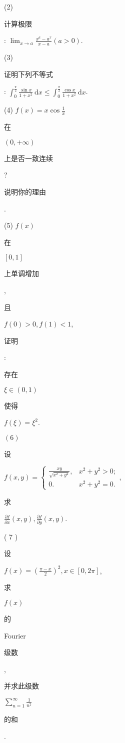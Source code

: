 \documentclass[10pt]{article}
\begin{document}
(2) \begin{CJK}{UTF8}{mj}计算极限\end{CJK}: $\lim _{x \rightarrow a} \frac{x^{a}-a^{x}}{x-a}(a>0)$.

(3) \begin{CJK}{UTF8}{mj}证明下列不等式\end{CJK}: $\int_{0}^{\frac{\pi}{2}} \frac{\sin x}{1+x^{2}} \mathrm{~d} x \leqslant \int_{0}^{\frac{\pi}{2}} \frac{\cos x}{1+x^{2}} \mathrm{~d} x$.

(4) $f(x)=x \cos \frac{1}{x}$ \begin{CJK}{UTF8}{mj}在\end{CJK} $(0,+\infty)$ \begin{CJK}{UTF8}{mj}上是否一致连续\end{CJK}? \begin{CJK}{UTF8}{mj}说明你的理由\end{CJK}.

(5) $f(x)$ \begin{CJK}{UTF8}{mj}在\end{CJK} $[0,1]$ \begin{CJK}{UTF8}{mj}上单调增加\end{CJK}, \begin{CJK}{UTF8}{mj}且\end{CJK} $f(0)>0, f(1)<1$, \begin{CJK}{UTF8}{mj}证明\end{CJK}: \begin{CJK}{UTF8}{mj}存在\end{CJK} $\xi \in(0,1)$ \begin{CJK}{UTF8}{mj}使得\end{CJK} $f(\xi)=\xi^{2}$.

$(6)$ \begin{CJK}{UTF8}{mj}设\end{CJK} $f(x, y)=\left\{\begin{array}{ll}\frac{x y}{\sqrt{x^{2}+y^{2}}}, & x^{2}+y^{2}>0 ; \\ 0 . & x^{2}+y^{2}=0 .\end{array}\right.$, \begin{CJK}{UTF8}{mj}求\end{CJK} $\frac{\partial f}{\partial x}(x, y), \frac{\partial f}{\partial y}(x, y)$.

( 7 ) \begin{CJK}{UTF8}{mj}设\end{CJK} $f(x)=\left(\frac{\pi-x}{2}\right)^{2}, x \in[0,2 \pi]$, \begin{CJK}{UTF8}{mj}求\end{CJK} $f(x)$ \begin{CJK}{UTF8}{mj}的\end{CJK} Fourier \begin{CJK}{UTF8}{mj}级数\end{CJK}, \begin{CJK}{UTF8}{mj}并求此级数\end{CJK} $\sum_{n=1}^{\infty} \frac{1}{n^{2}}$ \begin{CJK}{UTF8}{mj}的和\end{CJK}.
\end{document}
